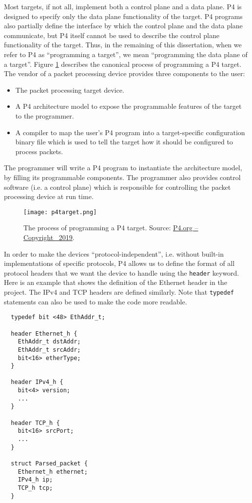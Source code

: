 Most targets, if not all, implement both a control plane and a data plane. P4 is designed to specify only the data plane functionality of the target. P4 programs also partially define the interface by which the control plane and the data plane communicate, but P4 itself cannot be used to describe the control plane functionality of the target. Thus, in the remaining of this dissertation, when we refer to P4 as “programming a target”, we mean “programming the data plane of a target”. Figure \ref{p4target} describes the canonical process of programming a P4 target. The vendor of a packet processing device provides three components to the user:

\begin{itemize}[leftmargin=*, noitemsep]
	\item The packet processing target device.
	\item A P4 architecture model to expose the programmable features of the target to the programmer.
	\item A compiler to map the user’s P4 program into a target-specific configuration binary file which is used to tell the target how it should be configured to process packets.
\end{itemize}

The programmer will write a P4 program to instantiate the architecture model, by filling its programmable components. The programmer also provides control software (i.e. a control plane) which is responsible for controlling the packet processing device at run time.

\begin{figure}[ht]
	\centering
	\texttt{[image: p4target.png]}
	\caption{The process of programming a P4 target. Source: \href{https://p4.org}{P4.org -- Copyright \textcopyright\ 2019}.} 
	\label{p4target}
\end{figure}

In order to make the devices ``protocol-independent'', i.e. without built-in implementations of specific protocols, P4 allows us to define the format of all protocol headers that we want the device to handle using the \texttt{header} keyword. Here is an example that shows the definition of the Ethernet header in the project. The IPv4 and TCP headers are defined similarly. Note that \texttt{typedef} statements can also be used to make the code more readable.

{\renewcommand{\baselinestretch}{0.8}\small
	\begin{verbatim}
  typedef bit <48> EthAddr_t;
	
  header Ethernet_h {
    EthAddr_t dstAddr;
    EthAddr_t srcAddr;
    bit<16> etherType;
  }
  
  header IPv4_h {
    bit<4> version;
    ...
  }
	
  header TCP_h {
    bit<16> srcPort;
    ...
  }
	
  struct Parsed_packet {
    Ethernet_h ethernet;
    IPv4_h ip;
    TCP_h tcp;
  }
	\end{verbatim}
}

